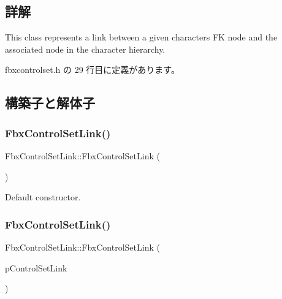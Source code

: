 \subsection{詳解}
This class represents a link between a given character\textquotesingle{}s FK node and the associated node in the character hierarchy. 

 fbxcontrolset.\+h の 29 行目に定義があります。



\subsection{構築子と解体子}
\mbox{\label{class_fbx_control_set_link_ae13e447eaf5a1f794b37d4a4f650377a}} 
\subsubsection{\texorpdfstring{Fbx\+Control\+Set\+Link()}{FbxControlSetLink()}\hspace{0.1cm}{\footnotesize\ttfamily [1/2]}}
{\footnotesize\ttfamily Fbx\+Control\+Set\+Link\+::\+Fbx\+Control\+Set\+Link (\begin{DoxyParamCaption}{ }\end{DoxyParamCaption})}



Default constructor. 

\mbox{\label{class_fbx_control_set_link_a9ecef760859353c34c59d180431ccfe6}} 
\subsubsection{\texorpdfstring{Fbx\+Control\+Set\+Link()}{FbxControlSetLink()}\hspace{0.1cm}{\footnotesize\ttfamily [2/2]}}
{\footnotesize\ttfamily Fbx\+Control\+Set\+Link\+::\+Fbx\+Control\+Set\+Link (\begin{DoxyParamCaption}\item[{const \hyperlink{class_fbx_control_set_link}{Fbx\+Control\+Set\+Link} \&}]{p\+Control\+Set\+Link }\end{DoxyParamCaption})}

